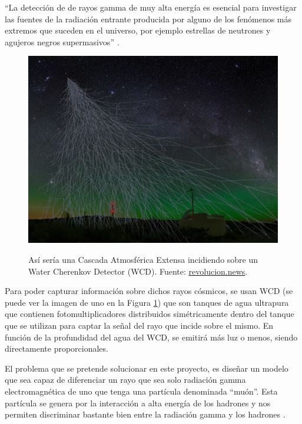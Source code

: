 \enquote{La detección de de rayos gamma de muy alta energía es esencial para investigar las fuentes de la radiación entrante producida por alguno de los fenómenos más extremos que suceden en el universo, por ejemplo estrellas de neutrones y agujeros negros supermasivos} \cite{gonzalez2021tackling}.

\begin{figure}[H]
	\includegraphics[scale=.3]{imagenes/01_Introduccion/EAS.jpg}
	\centering
	\label{fig:wcd}
	\caption{Así sería una Cascada Atmosférica Extensa incidiendo sobre un Water Cherenkov Detector (WCD). Fuente: \href{https://revolucion.news/cienciario.mx/los-rayos-cosmicos-de-muy-alta-energia-vienen-de-fuera-de-la-via-lactea/}{revolucion.news}.}
\end{figure}

Para poder capturar información sobre dichos rayos cósmicos, se usan WCD (se puede ver la imagen de uno en la Figura \ref{fig:wcd}) que son tanques de agua ultrapura que contienen fotomultiplicadores distribuidos simétricamente dentro del tanque que se utilizan para captar la señal del rayo que incide sobre el mismo. En función de la profundidad del agua del WCD, se emitirá más luz o menos, siendo directamente proporcionales.\newline

El problema que se pretende solucionar en este proyecto, es diseñar un modelo que sea capaz de diferenciar un rayo que sea solo radiación gamma electromagnética de uno que tenga una partícula denominada \enquote{muón}. Esta partícula se genera por la interacción a alta energía de los hadrones y nos permiten discriminar bastante bien entre la radiación gamma y los hadrones \cite{gonzalez2021tackling}.


